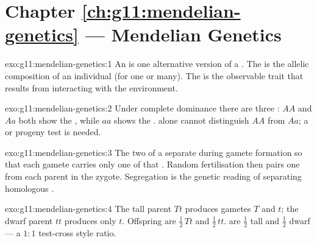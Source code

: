 \section*{Chapter \ref{ch:g11:mendelian-genetics} --- Mendelian Genetics}

\begin{solution}{exo:g11:mendelian-genetics:1}
An  is one alternative version of a . The  is the allelic
composition of an individual (for one  or many). The  is the
observable trait that results from  interacting with the environment.
\end{solution}

\begin{solution}{exo:g11:mendelian-genetics:2}
Under complete dominance there are three : $AA$ and $Aa$ both show the
 , while $aa$ shows the  .  alone
cannot distinguish $AA$ from $Aa$; a  or progeny test is needed.
\end{solution}

\begin{solution}{exo:g11:mendelian-genetics:3}
The two  of a  separate during gamete formation so that each gamete
carries only one  of that . Random fertilisation then pairs one 
from each parent in the zygote. Segregation is the genetic reading of 
separating homologous .
\end{solution}

\begin{solution}{exo:g11:mendelian-genetics:4}
The tall parent $Tt$ produces gametes $T$ and $t$; the dwarf parent $tt$
produces only $t$. Offspring  are $\tfrac12\,Tt$ and $\tfrac12\,tt$.
 are $\tfrac12$ tall and $\tfrac12$ dwarf --- a $1:1$ test-cross
style ratio.
\end{solution}

